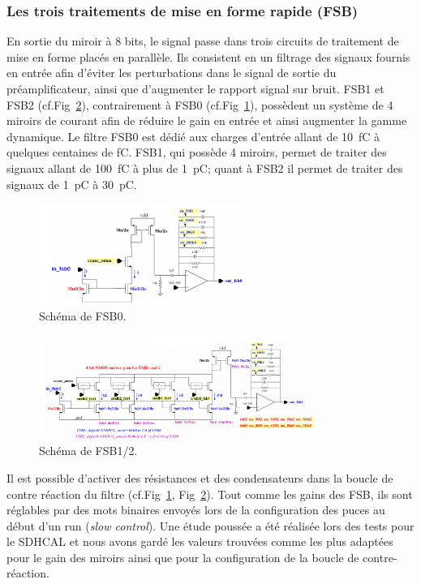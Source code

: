 \subsubsection{Les trois traitements de mise en forme rapide (FSB)}
En sortie du miroir à \num{8} bits, le signal passe dans trois circuits de traitement de mise en forme placés en parallèle. Ils consistent en un filtrage des signaux fournis en entrée afin d'éviter les perturbations dans le signal de sortie du préamplificateur, ainsi que d'augmenter le rapport signal sur bruit. FSB1 et FSB2 (cf.Fig~\ref{fsb1}), contrairement à FSB0 (cf.Fig~\ref{fsb0}), possèdent un système de \num{4} miroirs de courant afin de réduire le gain en entrée et ainsi augmenter la gamme dynamique. Le filtre FSB0 est dédié aux charges d'entrée allant de \SI{10}{\femto\coulomb} à quelques centaines de \si{\femto\coulomb}. FSB1, qui possède \num{4} miroirs, permet de traiter des signaux allant de \SI{100}{\femto\coulomb} à plus de \SI{1}{\pico\coulomb}; quant à FSB2 il permet de traiter des signaux de \SI{1}{\pico\coulomb} à \SI{30}{\pico\coulomb}.

\begin{figure}[ht!]
	\centering
	\includegraphics[width=0.60\textwidth]{GLA/FSB0.png}
	\captionsetup{type=figure}\caption{Schéma de FSB0.}
	\label{fsb0}
\end{figure}

\begin{figure}[ht!]
	\centering
	\includegraphics[width=0.8\textwidth]{GLA/FSB1.png}
	\captionsetup{type=figure}\caption{Schéma de FSB1/2.}
	\label{fsb1}
\end{figure}

Il est possible d'activer des résistances et des condensateurs dans la boucle de contre réaction du filtre (cf.Fig~\ref{fsb0}, Fig~\ref{fsb1}). Tout comme les gains des FSB, ils sont réglables par des mots binaires envoyés lors de la configuration des puces au début d'un run (\textit{slow control}). Une étude poussée a été réalisée lors des tests pour le SDHCAL et nous avons gardé les valeurs trouvées comme les plus adaptées pour le gain des miroirs ainsi que pour la configuration de la boucle de contre-réaction.

